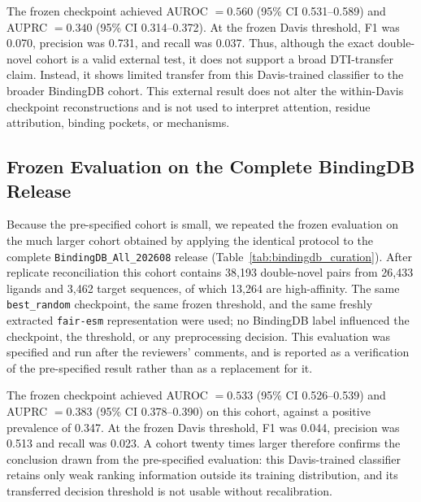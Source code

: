 \documentclass[fleqn,10pt]{wlscirep}
\begin{document}
The frozen checkpoint achieved AUROC $=0.560$ (95\% CI 0.531--0.589) and
AUPRC $=0.340$ (95\% CI 0.314--0.372).  At the frozen Davis threshold, F1 was
0.070, precision was 0.731, and recall was 0.037.  Thus, although the exact
double-novel cohort is a valid external test, it does not support a broad DTI-transfer claim.
Instead, it shows limited transfer from this
Davis-trained classifier to the broader BindingDB cohort.  This external result
does not alter the within-Davis checkpoint reconstructions and is not used to
interpret attention, residue attribution, binding pockets, or mechanisms.

\begingroup\color{red}
\subsection{Frozen Evaluation on the Complete BindingDB Release}
\label{sec:bindingdb_full}

Because the pre-specified cohort is small, we repeated the frozen evaluation on
the much larger cohort obtained by applying the identical protocol to the
complete \texttt{BindingDB\_All\_202608} release
(Table~\ref{tab:bindingdb_curation}).  After replicate reconciliation this
cohort contains 38{,}193 double-novel pairs from 26{,}433 ligands and 3{,}462
target sequences, of which 13{,}264 are high-affinity.  The same
\texttt{best\_random} checkpoint, the same frozen threshold, and the same
freshly extracted \texttt{fair-esm} representation were used; no BindingDB label
influenced the checkpoint, the threshold, or any preprocessing decision.  This
evaluation was specified and run after the reviewers' comments, and is reported
as a verification of the pre-specified result rather than as a replacement
for it.

The frozen checkpoint achieved AUROC $=0.533$ (95\% CI 0.526--0.539) and AUPRC $=0.383$ (95\% CI 0.378--0.390) on this cohort, against a positive prevalence of 0.347.  At the frozen Davis threshold, F1 was 0.044, precision was 0.513 and recall was 0.023.  A cohort twenty times larger therefore confirms the conclusion drawn from the pre-specified evaluation: this Davis-trained classifier retains only weak ranking information outside its training distribution, and its transferred decision threshold is not usable without recalibration.
\end{document}
